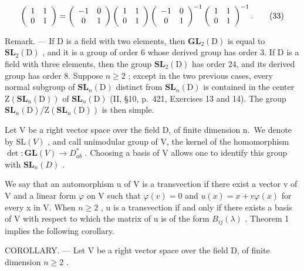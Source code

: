 \[
\left( \begin{array}{c c} 1 & 1 \\ 0 & 1 \end{array} \right) = \left( \begin{array}{c c} - 1 & 0 \\ 0 & 1 \end{array} \right) \left( \begin{array}{c c} 1 & 1 \\ 0 & 1 \end{array} \right) \left( \begin{array}{c c} - 1 & 0 \\ 0 & 1 \end{array} \right) ^ {- 1} \left( \begin{array}{c c} 1 & 1 \\ 0 & 1 \end{array} \right) ^ {- 1}.\tag{33}
\]

Remark. --- If D is a field with two elements, then \(\mathbf{GL}_{2}(\mathrm{D})\) is equal to \(\mathbf{SL}_{2}(\mathrm{D})\) , and it is a group of order 6 whose derived group has order 3. If D is a field with three elements, then the group \(\mathbf{SL}_{2}(\mathrm{D})\) has order 24, and its derived group has order 8. Suppose \(n \geqslant 2\) ; except in the two previous cases, every normal subgroup of \(\mathbf{SL}_{n}(\mathrm{D})\) distinct from \(\mathbf{SL}_{n}(\mathrm{D})\) is contained in the center \(\mathrm{Z}(\mathbf{SL}_{n}(\mathrm{D}))\) of \(\mathbf{SL}_{n}(\mathrm{D})\) (II, §10, p.~421, Exercises 13 and 14). The group \(\mathbf{SL}_{n}(\mathrm{D})/\mathrm{Z}(\mathbf{SL}_{n}(\mathrm{D}))\) is then simple.

Let V be a right vector space over the field D, of finite dimension n.~We denote by \(\mathrm{SL}(V)\) , and call unimodular group of V, the kernel of the homomorphism \(\det: \mathbf{GL}(V) \to D_{ab}^{*}\) . Choosing a basis of V allows one to identify this group with \(\mathbf{SL}_{n}(D)\) .

We say that an automorphism u of V is a transvection if there exist a vector v of V and a linear form \(\varphi\) on V such that \(\varphi(v)=0\) and \(u(x)=x+v\varphi(x)\) for every x in V. When \(n\geqslant2\) , u is a transvection if and only if there exists a basis of V with respect to which the matrix of u is of the form \(B_{ij}(\lambda)\) . Theorem 1 implies the following corollary.

COROLLARY. --- Let V be a right vector space over the field D, of finite dimension \(n \geqslant 2\) .

